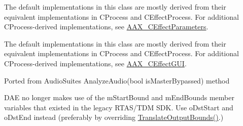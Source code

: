 
\begin{DoxyRefList}
\item[Class \mbox{\hyperlink{a01757}{AAX\+\_\+\+CEffect\+GUI}} ]\label{a00802__porting_notes000005}%
%
 The default implementations in this class are mostly derived from their equivalent implementations in CProcess and CEffect\+Process. For additional CProcess-\/derived implementations, see \mbox{\hyperlink{a01761}{AAX\+\_\+\+CEffect\+Parameters}}. 
\item[Class \mbox{\hyperlink{a01761}{AAX\+\_\+\+CEffect\+Parameters}} ]\label{a00802__porting_notes000006}%
%
 The default implementations in this class are mostly derived from their equivalent implementations in CProcess and CEffect\+Process. For additional CProcess-\/derived implementations, see \mbox{\hyperlink{a01757}{AAX\+\_\+\+CEffect\+GUI}}. 
\item[Member \mbox{\hyperlink{a01765_a2da61261e2d09dbafe37fa94ca39da07}{AAX\+\_\+\+CHost\+Processor\+::Analyze\+Audio}} (const float $\ast$const in\+Audio\+Ins\mbox{[}\mbox{]}, int32\+\_\+t in\+Audio\+In\+Count, int32\+\_\+t $\ast$io\+Window\+Size) AAX\+\_\+\+OVERRIDE]\label{a00802__porting_notes000009}%
%
 Ported from Audio\+Suite\textquotesingle{}s {\ttfamily Analyze\+Audio}(bool {\ttfamily is\+Master\+Bypassed}) method 
\item[Member \mbox{\hyperlink{a01765_a8beff35a046a1b3c780b1ecc1ded7e6e}{AAX\+\_\+\+CHost\+Processor\+::Init\+Output\+Bounds}} (int64\+\_\+t i\+Src\+Start, int64\+\_\+t i\+Src\+End, int64\+\_\+t $\ast$o\+Dst\+Start, int64\+\_\+t $\ast$o\+Dst\+End) AAX\+\_\+\+OVERRIDE]\label{a00802__porting_notes000007}%
%
 DAE no longer makes use of the m\+Start\+Bound and m\+End\+Bounds member variables that existed in the legacy RTAS/\+TDM SDK. Use {\ttfamily o\+Dst\+Start} and {\ttfamily o\+Dst\+End} instead (preferably by overriding \mbox{\hyperlink{a01765_a4d793e60071069e6f98c4d841d37ac96}{Translate\+Output\+Bounds()}}.) 
\item[Member \mbox{\hyperlink{a01765_ac0db2ad67d5fc29dab0b548f937c079a}{AAX\+\_\+\+CHost\+Processor\+::Render\+Audio}} (const float $\ast$const in\+Audio\+Ins\mbox{[}\mbox{]}, int32\+\_\+t in\+Audio\+In\+Count, float $\ast$const i\+Audio\+Outs\mbox{[}\mbox{]}, int32\+\_\+t i\+Audio\+Out\+Count, int32\+\_\+t $\ast$io\+Window\+Size) AAX\+\_\+\+OVERRIDE]\label{a00802__porting_notes000008}%
%

\end{DoxyRefList}
